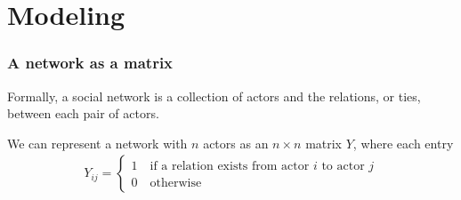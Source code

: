 \documentclass[compress, 9pt]{beamer}
\begin{document}
\section{Modeling}
\frame
{
\frametitle{A network as a matrix}
Formally, a social network is a collection of actors and the relations, or ties, between each 
pair of actors.  

We can represent a network with $n$ actors as an $n \times n$ matrix $Y$, where each entry
\begin{align*}
	Y_{ij} =
	\begin{cases} 	1 \quad \text{if a relation exists from actor $i$ to actor $j$}\\
					0 \quad \text{otherwise}
	\end{cases}
\end{align*}

}
\end{document}
